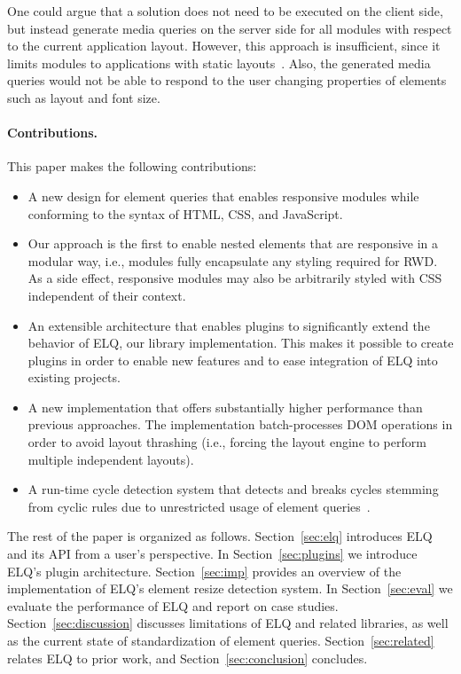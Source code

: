 \documentclass[]{llncs}
\newcommand{\elq}{ELQ}
\begin{document}
    One could argue that a solution does not need to be executed on the client side, but instead generate media queries on the server side for all modules with respect to the current application layout.
    However, this approach is insufficient, since it limits modules to applications with static layouts~\cite{elq-thesis}. Also, the generated media queries would not be able to respond to the user changing properties of elements such as layout and font size.

  \paragraph{Contributions.}
    This paper makes the following contributions:
    \begin{itemize}
      \item A new design for element queries that enables responsive modules while conforming to the syntax of HTML, CSS, and JavaScript.
      \item
        Our approach is the first to enable nested elements that are responsive in a modular way, i.e., modules fully encapsulate any styling required for RWD.
        As a side effect, responsive modules may also be arbitrarily styled with CSS independent of their context.
      \item
        An extensible architecture that enables plugins to significantly extend the behavior of ELQ, our library implementation.
        This makes it possible to create plugins in order to enable new features and to ease integration of \elq{} into existing projects.
      \item
        A new implementation that offers substantially higher performance than previous approaches.
        The implementation batch-processes DOM operations in order to avoid layout thrashing (i.e., forcing the layout engine to perform multiple independent layouts).
      \item
        A run-time cycle detection system that detects and breaks cycles stemming from cyclic rules due to unrestricted usage of element queries~\cite{elq-thesis}.
    \end{itemize}

  \noindent
  The rest of the paper is organized as follows.
  Section~\ref{sec:elq} introduces \elq{} and its API from a user's perspective.
  In Section~\ref{sec:plugins} we introduce \elq{}'s plugin architecture.
  Section~\ref{sec:imp} provides an overview of the implementation of \elq{}'s element resize detection system.
  In Section~\ref{sec:eval} we evaluate the performance of \elq{} and report on case studies.
  Section~\ref{sec:discussion} discusses limitations of \elq{} and related libraries, as well as the current state of standardization of element queries.
  Section~\ref{sec:related} relates \elq{} to prior work, and Section~\ref{sec:conclusion} concludes.
\end{document}

